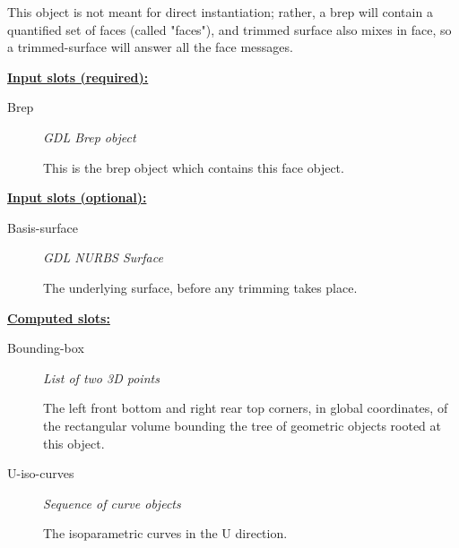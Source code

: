 \documentclass [11pt]{book}
\begin{document}
\begin{itemize}
\begin{description}
This object is not meant for direct instantiation; rather, a brep will contain a quantified set of faces (called "faces"),
and trimmed surface also mixes in face, so a trimmed-surface will answer all the face messages.



\end{description}








\textbf{
\underline{Input slots (required):}}

\begin{description}

\item [Brep]
\emph{GDL Brep object}

 This is the brep object which contains this face object.




\end{description}






\textbf{
\underline{Input slots (optional):}}

\begin{description}

\item [Basis-surface]
\emph{GDL NURBS Surface}

 The underlying surface, before any trimming takes place.




\end{description}






\textbf{
\underline{Computed slots:}}

\begin{description}

\item [Bounding-box]
\emph{List of two 3D points}

 The left front bottom and right rear top corners, in global coordinates,
of the rectangular volume bounding the tree of geometric objects rooted at this object.




\item [U-iso-curves]
\emph{Sequence of curve objects}

 The isoparametric curves in the U direction.





\end{description}
\end{itemize}
\end{document}
